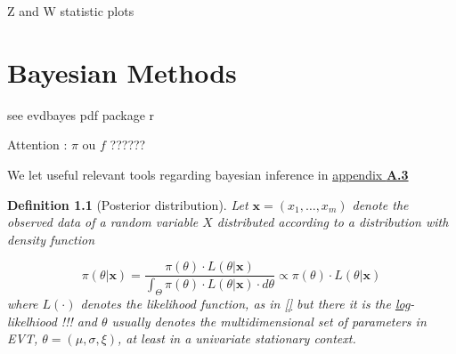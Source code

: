 \documentclass[11pt,a4paper,openany ]{book}
\newtheorem{definition}{Definition}[chapter]
\begin{document}
Z and W statistic plots








\chapter{Bayesian Methods}\label{sec::bayesian}
\minitoc\thispagestyle{empty}

see evdbayes pdf package r

Attention : $\pi$ ou $f$ ?????? 

We let useful relevant tools regarding bayesian inference in \hyperref[bayesapp]{appendix 
	\textbf{A.3}}


\begin{definition}[Posterior distribution]
	Let $\boldsymbol{x}=(x_1,\dots,x_m)$
	denote the observed data of a random variable $X$ distributed according to a distribution with density function 
	
	
	\begin{equation}\label{bayeseq}
	\pi (\theta|\boldsymbol{x})=\frac{\pi(\theta)\cdot L(\theta|\boldsymbol{x})}{\int_{\Theta} 
		\pi(\theta)\cdot L(\theta|\boldsymbol{x}) \cdot d\theta}\propto \pi(\theta)\cdot 
	L(\theta|\boldsymbol{x})
	\end{equation}
	where $L(\cdot)$ denotes the likelihood function, as in \ref{} but there it is the \underline{log}-likelhiood !!!
	and $\theta$ usually denotes the multidimensional set of parameters in EVT, $\theta=(\mu,\sigma,\xi)$, at least in a univariate stationary context.
\end{definition}
\end{document}
